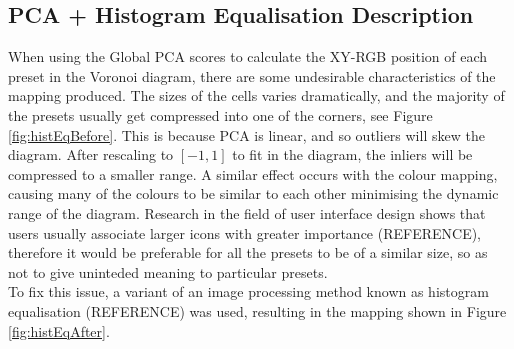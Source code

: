 \documentclass[11pt, oneside]{report}   	%
\begin{document}
\subsection{PCA + Histogram Equalisation Description}
When using the Global PCA scores to calculate the XY-RGB position of each preset in the Voronoi diagram, there are some undesirable characteristics of the mapping produced. The sizes of the cells varies dramatically, and the majority of the presets usually get compressed into one of the corners, see Figure \ref{fig:histEqBefore}. This is because PCA is linear, and so outliers will skew the diagram. After rescaling to $[-1, 1]$ to fit in the diagram, the inliers will be compressed to a smaller range. A similar effect occurs with the colour mapping, causing many of the colours to be similar to each other minimising the dynamic range of the diagram. Research in the field of user interface design shows that users usually associate larger icons with greater importance (REFERENCE), therefore it would be preferable for all the presets to be of a similar size, so as not to give uninteded meaning to particular presets.\\
To fix this issue, a variant of an image processing method known as histogram equalisation (REFERENCE) was used, resulting in the mapping shown in Figure \ref{fig:histEqAfter}.
\end{document}

